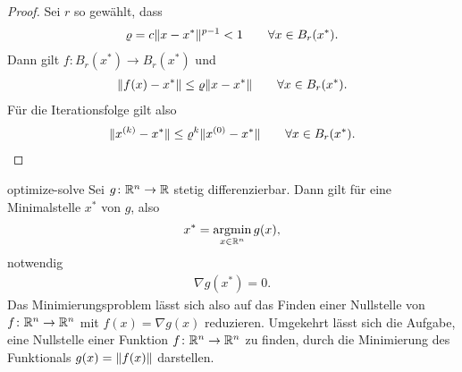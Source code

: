 \begin{proof}
  Sei $r$ so gewählt, dass
  \begin{gather}
    \varrho = c \lVert x-x^*\rVert^{p-1} < 1 \qquad\forall x\in B_r(x^*).
  \end{gather}
  Dann gilt $f\colon  B_r(x^*) \to  B_r(x^*)$ und
  \begin{gather}
    \lVert f(x)-x^*\rVert \le \varrho \lVert x-x^*\rVert \qquad\forall x\in B_r(x^*).
  \end{gather}
  Für die Iterationsfolge gilt also
  \begin{gather}
    \lVert x^{(k)}-x^*\rVert
    \le \varrho^k \lVert x^{(0)}-x^*\rVert
    \qquad\forall x\in B_r(x^*).
  \end{gather} 
\end{proof}

\begin{Satz}{optimize-solve}
  Sei $g\colon \mathbb R^n\to \mathbb R$ stetig differenzierbar. Dann gilt für eine
  Minimalstelle $x^*$ von $g$, also
  \begin{gather}
    x^* = \operatorname*{argmin}_{x\in\mathbb R^n} g(x),
  \end{gather}
  notwendig
  \begin{gather}
    \nabla g(x^*) = 0.
  \end{gather}
  Das Minimierungsproblem lässt sich also auf das Finden einer
  Nullstelle von $f\colon \mathbb R^n\to \mathbb R^n$ mit $f(x) = \nabla g(x)$
  reduzieren. Umgekehrt lässt sich die Aufgabe, eine Nullstelle einer
  Funktion $f\colon \mathbb R^n \to \mathbb R^n$ zu finden, durch die Minimierung
  des Funktionals $g(x) = \lVert f(x)\rVert$ darstellen.
\end{Satz}


